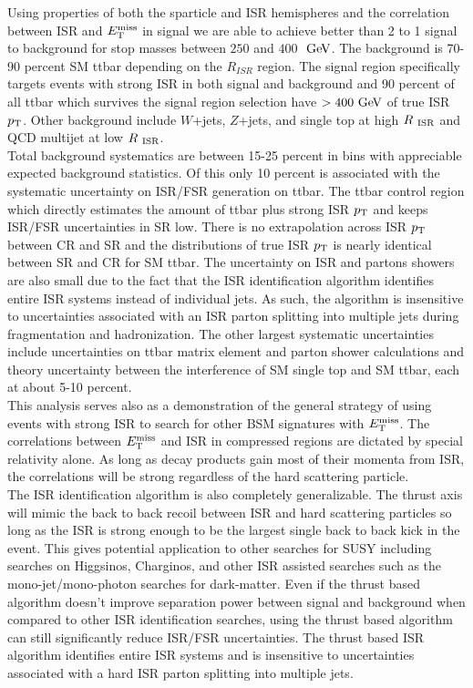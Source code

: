 \indent Using properties of both the sparticle and ISR hemispheres and the correlation between ISR and $E_{\mathrm{T}}^{\mathrm{miss}}$ in signal we are able to achieve better than 2 to 1 signal to background for stop masses between $250$ and $400$ $\gev$.  The background is 70-90 percent SM ttbar depending on the $R_{ISR}$ region.  The signal region specifically targets events with strong ISR in both signal and background and 90 percent of all ttbar which survives the signal region selection have $> 400 \gev$ of true ISR $p_{\mathrm{T}}$. Other background include $W$+jets, $Z$+jets, and single top at high $R_{~\mathrm{ISR}}$ and QCD multijet at low $R_{~\mathrm{ISR}}$. \\

\indent Total background systematics are between 15-25 percent in bins with appreciable expected background statistics.  Of this only 10 percent is associated with the systematic uncertainty on ISR/FSR generation on ttbar.  The ttbar control region which directly estimates the amount of ttbar plus strong ISR $p_{\mathrm{T}}$ and keeps ISR/FSR uncertainties in SR low.  There is no extrapolation across ISR $p_{\mathrm{T}}$ between CR and SR and the distributions of true ISR $p_{\mathrm{T}}$ is nearly identical between SR and CR for SM ttbar.  The uncertainty on ISR and partons showers are also small due to the fact that the ISR identification algorithm identifies entire ISR systems instead of individual jets.  As such, the algorithm is insensitive to uncertainties associated with an ISR parton splitting into multiple jets during fragmentation and hadronization.  The other largest systematic uncertainties include uncertainties on ttbar matrix element and parton shower calculations and theory uncertainty between the interference of SM single top and SM ttbar, each at about 5-10 percent.    \\

\indent This analysis serves also as a demonstration of the general strategy of using events with strong ISR to search for other BSM signatures with $E_{\mathrm{T}}^{\mathrm{miss}}$.  The correlations between $E_{\mathrm{T}}^{\mathrm{miss}}$ and ISR in compressed regions are dictated by special relativity alone.  As long as decay products gain most of their momenta from ISR, the correlations will be strong regardless of the hard scattering particle. \\

\indent The ISR identification algorithm is also completely generalizable.  The thrust axis will mimic the back to back recoil between ISR and hard scattering particles so long as the ISR is strong enough to be the largest single back to back kick in the event.  This gives potential application to other searches for SUSY including searches on Higgsinos, Charginos, and other ISR assisted searches such as the mono-jet/mono-photon searches for dark-matter.  Even if the thrust based algorithm doesn't improve separation power between signal and background when compared to other ISR identification searches, using the thrust based algorithm can still significantly reduce ISR/FSR uncertainties.  The thrust based ISR algorithm identifies entire ISR systems and is insensitive to uncertainties associated with a hard ISR parton splitting into multiple jets. \\

